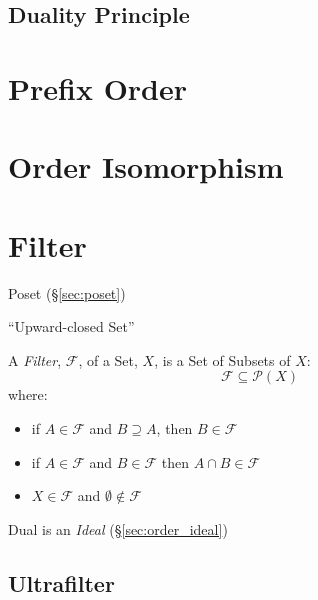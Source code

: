 \subsection{Duality Principle}\label{sec:duality_principle}



\section{Prefix Order}\label{sec:prefix_order}

\section{Order Isomorphism}\label{sec:order_isomorphism}

\section{Filter}\label{sec:filter}

Poset (\S\ref{sec:poset})

``Upward-closed Set''

A \emph{Filter}, $\mathcal{F}$, of a Set, $X$, is a Set of Subsets of
$X$:
\[
  \mathcal{F} \subseteq \mathcal{P}(X)
\]
where:
\begin{itemize}
\item if $A \in \mathcal{F}$ and $B \supseteq A$, then $B \in
  \mathcal{F}$
\item if $A \in \mathcal{F}$ and $B \in \mathcal{F}$ then $A \cap B
  \in \mathcal{F}$
\item $X \in \mathcal{F}$ and $\emptyset \notin \mathcal{F}$
\end{itemize}

Dual is an \emph{Ideal} (\S\ref{sec:order_ideal})



\subsection{Ultrafilter}\label{sec:ultrafilter}

